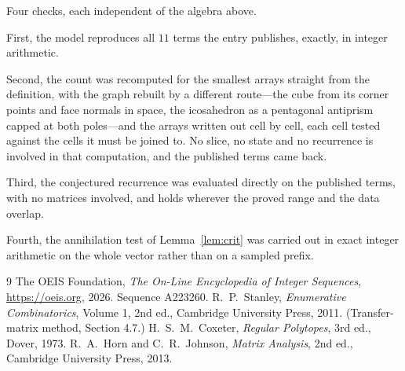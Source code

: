 \documentclass[11pt,a4paper]{article}
\theoremstyle{plain}
\theoremstyle{definition}
\begin{document}
Four checks, each independent of the algebra above.

First, the model reproduces all $11$ terms the entry publishes, exactly, in integer
arithmetic.

Second, the count was recomputed for the smallest arrays straight from the definition, with the
graph rebuilt by a different route---the cube from its corner points and face normals in space,
the icosahedron as a pentagonal antiprism capped at both poles---and the arrays written out cell
by cell, each cell tested against the cells it must be joined to. No slice, no state and no
recurrence is involved in that computation, and the published terms came back.

Third, the conjectured recurrence was evaluated directly on the published terms, with no
matrices involved, and holds wherever the proved range and the data overlap.

Fourth, the annihilation test of Lemma~\ref{lem:crit} was carried out in exact integer
arithmetic on the whole vector rather than on a sampled prefix.

\begin{thebibliography}{9}
 The OEIS Foundation, \emph{The On-Line Encyclopedia of Integer
Sequences}, \url{https://oeis.org}, 2026. Sequence A223260.
 R.~P.~Stanley, \emph{Enumerative Combinatorics}, Volume 1, 2nd ed.,
Cambridge University Press, 2011. (Transfer-matrix method, Section 4.7.)
 H.~S.~M.~Coxeter, \emph{Regular Polytopes}, 3rd ed., Dover, 1973.
 R.~A.~Horn and C.~R.~Johnson, \emph{Matrix Analysis}, 2nd ed., Cambridge
University Press, 2013.
\end{thebibliography}
\end{document}
